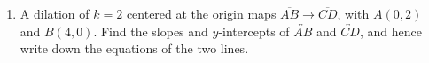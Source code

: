\documentclass[12pt, twoside]{article}
\begin{document}
\begin{enumerate}
    \begin{center} %
    \end{center}

  \item A dilation of $k=2$ centered at the origin maps $\overline{AB} \rightarrow \overline{CD}$, with $A(0,2)$ and $B(4,0)$. Find the slopes and $y$-intercepts of $\overleftrightarrow{AB}$ and $\overleftrightarrow{CD}$, and hence write down the equations of the two lines.

\end{enumerate}
\end{document}
